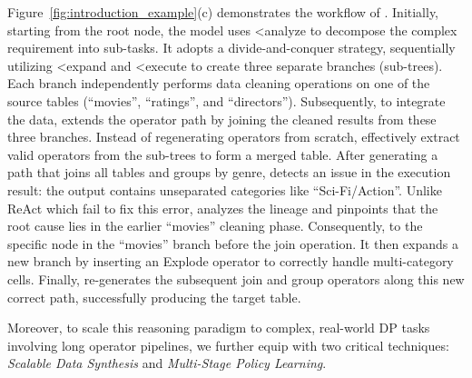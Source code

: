 
\begin{example}
\label{exam:agentic_tree_based_reasoning}
    Figure~\ref{fig:introduction_example}(c) demonstrates the workflow of \sys. 
    Initially, starting from the root node, the model uses {<analyze} to decompose the complex requirement into sub-tasks. It adopts a divide-and-conquer strategy, sequentially utilizing {<expand} and {<execute} to create three separate branches (sub-trees). Each branch independently performs data cleaning operations on one of the source tables (``{movies}'', ``{ratings}'', and ``{directors}'').
    Subsequently, to integrate the data, \sys extends the operator path by joining the cleaned results from these three branches. Instead of regenerating operators from scratch, \sys effectively extract valid operators from the sub-trees to form a merged table.
    After generating a path that joins all tables and groups by genre, \sys detects an issue in the execution result: the output contains unseparated categories like ``Sci-Fi/Action''. 
    Unlike ReAct which fail to fix this error, \sys analyzes the lineage and pinpoints that the root cause lies in the earlier ``{movies}'' cleaning phase. 
    Consequently,  to the specific node in the ``{movies}'' branch before the join operation. It then {expands a new branch} by inserting an {Explode} operator to correctly handle multi-category cells. Finally, \sys re-generates the subsequent join and group operators along this new correct path, successfully producing the target table.
\end{example}

Moreover, to scale this reasoning paradigm to complex, real-world DP tasks involving long operator pipelines, we further equip \sys with two critical techniques: \textit{Scalable Data Synthesis} and \textit{Multi-Stage Policy Learning}.

